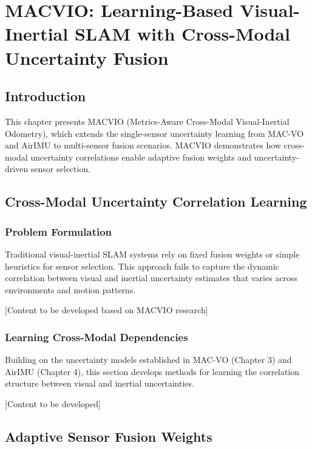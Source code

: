 \chapter{MACVIO: Learning-Based Visual-Inertial SLAM with Cross-Modal Uncertainty Fusion} \label{chapter:macvio}

\section{Introduction}

This chapter presents MACVIO (Metrics-Aware Cross-Modal Visual-Inertial Odometry), which extends the single-sensor uncertainty learning from MAC-VO and AirIMU to multi-sensor fusion scenarios. MACVIO demonstrates how cross-modal uncertainty correlations enable adaptive fusion weights and uncertainty-driven sensor selection.

\section{Cross-Modal Uncertainty Correlation Learning}

\subsection{Problem Formulation}

Traditional visual-inertial SLAM systems rely on fixed fusion weights or simple heuristics for sensor selection. This approach fails to capture the dynamic correlation between visual and inertial uncertainty estimates that varies across environments and motion patterns.

[Content to be developed based on MACVIO research]

\subsection{Learning Cross-Modal Dependencies}

Building on the uncertainty models established in MAC-VO (Chapter 3) and AirIMU (Chapter 4), this section develops methods for learning the correlation structure between visual and inertial uncertainties.

[Content to be developed]

\section{Adaptive Sensor Fusion Weights}

